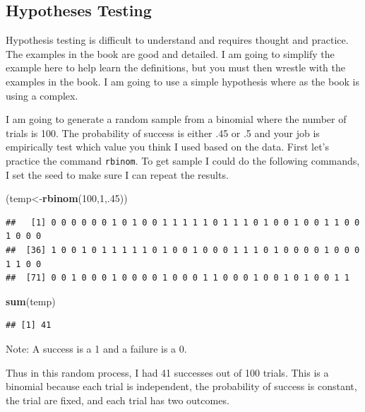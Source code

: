 \documentclass[]{book}
\newenvironment{Shaded}{\begin{snugshade}}{\end{snugshade}}
\newcommand{\KeywordTok}[1]{\textcolor[rgb]{0.13,0.29,0.53}{\textbf{#1}}}
\newcommand{\DecValTok}[1]{\textcolor[rgb]{0.00,0.00,0.81}{#1}}
\newcommand{\NormalTok}[1]{#1}
\theoremstyle{definition}
\theoremstyle{definition}
\theoremstyle{definition}
\theoremstyle{remark}
\begin{document}
\subsection{Hypotheses Testing}\label{hypotheses-testing}

Hypothesis testing is difficult to understand and requires thought and
practice. The examples in the book are good and detailed. I am going to
simplify the example here to help learn the definitions, but you must
then wrestle with the examples in the book. I am going to use a simple
hypothesis where as the book is using a complex.

I am going to generate a random sample from a binomial where the number
of trials is 100. The probability of success is either .45 or .5 and
your job is empirically test which value you think I used based on the
data. First let's practice the command \texttt{rbinom}. To get sample I
could do the following commands, I set the seed to make sure I can
repeat the results.

\begin{Shaded}
\begin{Highlighting}[]
\NormalTok{(temp<-}\KeywordTok{rbinom}\NormalTok{(}\DecValTok{100}\NormalTok{,}\DecValTok{1}\NormalTok{,.}\DecValTok{45}\NormalTok{))}
\end{Highlighting}
\end{Shaded}

\begin{verbatim}
##   [1] 0 0 0 0 0 0 1 0 1 0 0 1 1 1 1 1 0 1 1 1 0 1 0 0 1 0 0 1 1 0 0 1 0 0 0
##  [36] 1 0 0 1 0 1 1 1 1 1 0 1 0 0 1 0 0 0 1 1 1 0 1 0 0 0 0 1 0 0 0 1 1 0 0
##  [71] 0 0 1 0 0 0 1 0 0 0 0 1 0 0 0 1 1 0 0 0 1 0 0 1 0 1 0 0 1 1
\end{verbatim}

\begin{Shaded}
\begin{Highlighting}[]
\KeywordTok{sum}\NormalTok{(temp)}
\end{Highlighting}
\end{Shaded}

\begin{verbatim}
## [1] 41
\end{verbatim}

Note: A success is a 1 and a failure is a 0.

Thus in this random process, I had 41 successes out of 100 trials. This
is a binomial because each trial is independent, the probability of
success is constant, the trial are fixed, and each trial has two
outcomes.
\end{document}
